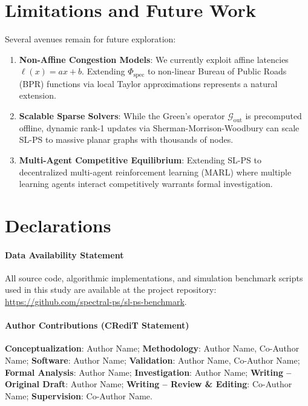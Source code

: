 \documentclass[11pt,a4paper]{article}
\begin{document}
\section{Limitations and Future Work}
\label{sec:limitations}

Several avenues remain for future exploration:
\begin{enumerate}
    \item \textbf{Non-Affine Congestion Models}: We currently exploit affine latencies $\ell(x) = ax + b$. Extending $\Phi_{\text{spec}}$ to non-linear Bureau of Public Roads (BPR) functions via local Taylor approximations represents a natural extension.
    \item \textbf{Scalable Sparse Solvers}: While the Green's operator $\mathcal{G}_{\text{out}}$ is precomputed offline, dynamic rank-1 updates via Sherman-Morrison-Woodbury can scale SL-PS to massive planar graphs with thousands of nodes.
    \item \textbf{Multi-Agent Competitive Equilibrium}: Extending SL-PS to decentralized multi-agent reinforcement learning (MARL) where multiple learning agents interact competitively warrants formal investigation.
\end{enumerate}

\section*{Declarations}

\paragraph{Data Availability Statement}
All source code, algorithmic implementations, and simulation benchmark scripts used in this study are available at the project repository: \url{https://github.com/spectral-ps/sl-ps-benchmark}.

\paragraph{Author Contributions (CRediT Statement)}
\textbf{Conceptualization}: Author Name; \textbf{Methodology}: Author Name, Co-Author Name; \textbf{Software}: Author Name; \textbf{Validation}: Author Name, Co-Author Name; \textbf{Formal Analysis}: Author Name; \textbf{Investigation}: Author Name; \textbf{Writing -- Original Draft}: Author Name; \textbf{Writing -- Review \& Editing}: Co-Author Name; \textbf{Supervision}: Co-Author Name.
\end{document}
